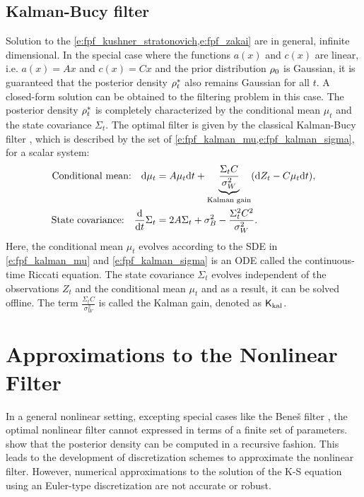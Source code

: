 \subsection{Kalman-Bucy filter}
Solution to the \cref{e:fpf_kushner_stratonovich,e:fpf_zakai} are in general, infinite dimensional. In the special case where the functions $a(x)$ and $c(x)$ are linear, i.e. $a(x) = Ax$ and $c(x) = Cx$ and the prior distribution $\rho_0$ is Gaussian, it is guaranteed that the posterior density $\rho^*_t$ also remains Gaussian for all $t$. A closed-form solution can be obtained to the filtering problem in this case. The posterior density $\rho^*_t$ is completely characterized by the conditional mean $\mu_t$ and the state covariance $\Sigma_t$. The optimal filter is given by the classical Kalman-Bucy filter \cite{kal64}, which is described by the set of \cref{e:fpf_kalman_mu,e:fpf_kalman_sigma}, for a scalar system:
\begin{align}
\text{Conditional mean:} \quad \ud \mu_t & = A \mu_t \ud t + \underbrace{\frac{\Sigma_t C}{\sigma^2_W}}_{\text{Kalman gain}} ( \ud Z_t - C \mu_t \ud t), 
\label{e:fpf_kalman_mu} \\
\text{State covariance:}  \quad  \frac{\ud}{\ud t} \Sigma_t &= 2 A \Sigma_t + \sigma^2_B - \frac{\Sigma^2_t C^2}{\sigma^2_W}. 
\label{e:fpf_kalman_sigma}
\end{align}
Here, the conditional mean $\mu_t$ evolves according to the SDE in \eqref{e:fpf_kalman_mu} and \eqref{e:fpf_kalman_sigma} is an ODE called the continuous-time Riccati equation. The state covariance $\Sigma_t$ evolves independent of the observations $Z_t$ and the conditional mean $\mu_t$ and as a result, it can be solved offline.  
The term $\frac{\Sigma_t C}{\sigma^2_W}$ is called the Kalman gain, denoted as $\sf K_{\text{kal}}$. 
\section{Approximations to the Nonlinear Filter}
\label{s:approx_nl_filter}
In a general nonlinear setting, excepting special cases like the Bene\v{s} filter \cite{ben81}, the optimal nonlinear filter cannot expressed in terms of a finite set of parameters.  show that the posterior density can be computed in a recursive fashion. This leads to the development of discretization schemes to approximate the nonlinear filter. However, numerical approximations to the solution of the K-S equation using an Euler-type discretization are not accurate or robust. 


